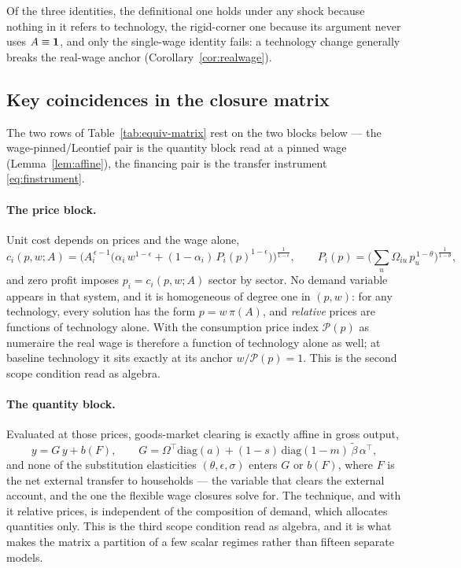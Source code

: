 Of the three identities, the definitional one holds under any shock because
nothing in it refers to technology, the rigid-corner one because its argument
never uses $A\equiv\mathbf{1}$, and only the single-wage identity fails:
a technology change generally breaks the real-wage anchor
(Corollary~\ref{cor:realwage}).

\subsection*{Key coincidences in the closure matrix}

The two rows of Table~\ref{tab:equiv-matrix} rest on the two blocks below --- the
wage-pinned/Leontief pair is the quantity block read at a pinned wage
(Lemma~\ref{lem:affine}), the financing pair is the transfer instrument
\eqref{eq:finstrument}.




\paragraph{The price block.} Unit cost depends on prices and the wage alone,
\begin{equation}
c_i(p,w;A) = \Big( A_i^{\,\epsilon-1}\big( \alpha_i\, w^{1-\epsilon}
+ (1-\alpha_i)\, P_i(p)^{1-\epsilon} \big) \Big)^{\frac{1}{1-\epsilon}},
\qquad
P_i(p) = \Big( \textstyle\sum_u \Omega_{iu}\, p_u^{\,1-\theta} \Big)^{\frac{1}{1-\theta}},
\label{eq:appA-cost}
\end{equation}
and zero profit imposes $p_i = c_i(p,w;A)$ sector by sector. No demand
variable appears in that system, and it is homogeneous of degree one in
$(p,w)$: for any technology, every solution has the form $p = w\,\pi(A)$, and
\emph{relative} prices are functions of technology alone. With the
consumption price index $\mathcal{P}(p)$ as numeraire the real wage is therefore a
function of technology alone as well; at baseline technology it sits exactly
at its anchor $w/\mathcal{P}(p) = 1$. This is the second scope condition read as
algebra.

\paragraph{The quantity block.} Evaluated at those prices, goods-market
clearing is exactly affine in gross output,
\begin{equation}
y = G\,y + b(F), \qquad
G = \Omega^{\!\top}\mathrm{diag}(a)
  + (1-s)\,\mathrm{diag}(1-m)\,\tilde\beta\,\alpha^{\!\top},
\label{eq:appA-affine}
\end{equation}
and none of the substitution elasticities $(\theta,\epsilon,\sigma)$ enters
$G$ or $b(F)$, where $F$ is the net external transfer to households --- the
variable that clears the external account, and the one the flexible wage closures
solve for. The technique, and with it relative prices, is independent of the
composition of demand, which allocates quantities only. This is the third
scope condition read as algebra, and it is what makes the matrix a partition
of a few scalar regimes rather than fifteen separate models.

